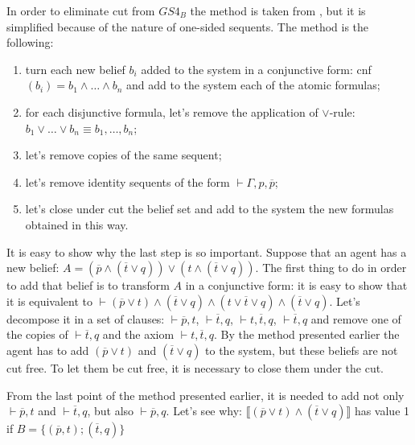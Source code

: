 \documentclass[a4paper, 12pt, oneside]{article}
\theoremstyle{plain}
\theoremstyle{definition}
\begin{document}
In order to eliminate cut from $GS4_B$ the method is taken from \cite{piazzapulcini_uniqueness}, but it is simplified because of the nature of one-sided sequents. The method is the following:

\begin{enumerate}
\item turn each new belief $b_i$ added to the system in a conjunctive form: cnf$(b_i) = b_1 \wedge \dots \wedge b_n$ and add to the system each of the atomic formulas;
\item for each disjunctive formula,  let's remove the application of $\vee$-rule: $b_1 \vee \dots \vee b_n \equiv b_1, \dots , b_n$;
\item let's remove copies of the same sequent;
\item let's remove identity sequents of the form $\vdash \Gamma, p, \overline{p}$;
\item let's close under cut the belief set and add to the system the  new formulas obtained in this way.
\end{enumerate}

It is easy to show why the last step is so important.  Suppose that an agent has a new belief: $A =   (\overline{p} \wedge (\overline{t} \vee q))\vee (t\wedge (\overline{t}\vee q))$. The first thing to do in order to add that belief is to transform $A$ in a conjunctive form: it is easy to show that it is equivalent to $\vdash (\overline{p} \vee t)\wedge(\overline{t}\vee q)\wedge (t \vee \overline{t}\vee q) \wedge (\overline{t} \vee q)$.  Let's decompose it in a set of clauses: $\vdash \overline{p}, t$, $\vdash \overline{t}, q$, $\vdash t, \overline{t}, q$, $\vdash \overline{t}, q$ and remove one of the copies of $\vdash \overline{t}, q$ and the axiom $\vdash t, \overline{t}, q$.  By the method presented earlier the agent has to add $(\overline{p} \vee t)$ and $(\overline{t} \vee q)$ to the system, but these beliefs are not cut free. To let them be cut free, it is necessary to close them under the cut.

	\begin{prooftree}
	
	
	
\end{prooftree}
\noindent
	From the last point of the method presented earlier, it is needed to add not only $\vdash \overline{p}, t$ and $\vdash \overline{t}, q$, but also $\vdash  \overline{p}, q$. Let's see why:
	$\llbracket (\overline{p} \vee t) \wedge (\overline{t} \vee q) \rrbracket$ has value 1 if $B = \lbrace (\overline{p}, t); (\overline{t}, q)\rbrace$
		
\end{document}
